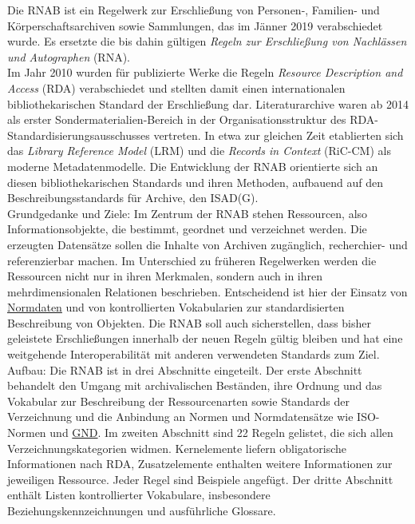 \documentclass{article}
\begin{document}
    Die RNAB ist ein Regelwerk zur Erschließung von Personen-, Familien- und Körperschaftsarchiven sowie Sammlungen, das im Jänner 2019 verabschiedet wurde. Es ersetzte die bis dahin gültigen \emph{Regeln zur Erschließung von Nachlässen und Autographen} (RNA).\\
            
        Im Jahr 2010 wurden für publizierte Werke die Regeln \emph{Resource Description and Access} (RDA) verabschiedet und stellten damit einen internationalen bibliothekarischen Standard der Erschließung dar. Literaturarchive waren ab 2014 als erster Sondermaterialien-Bereich in der Organisationsstruktur des RDA-Standardisierungsausschusses vertreten. In etwa zur gleichen Zeit etablierten sich das \emph{Library Reference Model} (LRM) und die \emph{Records in Context} (RiC-CM) als moderne Metadatenmodelle. Die Entwicklung der RNAB orientierte sich an diesen bibliothekarischen Standards und ihren Methoden, aufbauend auf den Beschreibungsstandards für Archive, den ISAD(G).\\
            
        Grundgedanke und Ziele: Im Zentrum der RNAB stehen Ressourcen, also Informationsobjekte, die bestimmt, geordnet und verzeichnet werden. Die erzeugten Datensätze sollen die Inhalte von Archiven zugänglich, recherchier- und referenzierbar machen. Im Unterschied zu früheren Regelwerken werden die Ressourcen nicht nur in ihren Merkmalen, sondern auch in ihren mehrdimensionalen Relationen beschrieben. Entscheidend ist hier der Einsatz von \href{http://gams.uni-graz.at/o:konde.147}{Normdaten} und von kontrollierten Vokabularien zur standardisierten Beschreibung von Objekten. Die RNAB soll auch sicherstellen, dass bisher geleistete Erschließungen innerhalb der neuen Regeln gültig bleiben und hat eine weitgehende Interoperabilität mit anderen verwendeten Standards zum Ziel.\\
            
        Aufbau: Die RNAB ist in drei Abschnitte eingeteilt. Der erste Abschnitt behandelt den Umgang mit archivalischen Beständen, ihre Ordnung und das Vokabular zur Beschreibung der Ressourcenarten sowie Standards der Verzeichnung und die Anbindung an Normen und Normdatensätze wie ISO-Normen und \href{http://gams.uni-graz.at/o:konde.109}{GND}. Im zweiten Abschnitt sind 22 Regeln gelistet, die sich allen Verzeichnungskategorien widmen. Kernelemente liefern obligatorische Informationen nach RDA, Zusatzelemente enthalten weitere Informationen zur jeweiligen Ressource. Jeder Regel sind Beispiele angefügt. Der dritte Abschnitt enthält Listen kontrollierter Vokabulare, insbesondere Beziehungskennzeichnungen und ausführliche Glossare.\\
            
\end{document}
